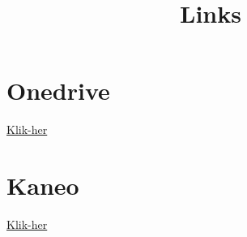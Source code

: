 \documentclass[a4paper,12pt]{article}
\title{Links}
\begin{document}
\maketitle

\section{Onedrive}
\href{https://aarhusuniversitet-my.sharepoint.com/:f:/g/personal/au780068_uni_au_dk/IgDwXT80DgrERoDELxkZ9EvhAXCKid-1hXYYbnTBg_3ttGE?e=wkl1Gr}{Klik-her}


\section{Kaneo}
\href{https://kaneo.mosekjaer.com/invitation/accept/VI7UlD9HuN3NTND8vqDTVehmeKg9qnqE?email=au780068@uni.au.dk}{Klik-her}
\end{document}
